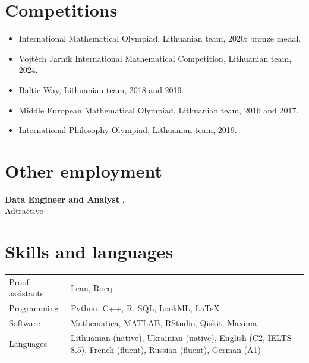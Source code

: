 \documentclass[10.5pt,a4paper]{article}
\newlength{\datecol}\setlength{\datecol}{2.4cm}
\newcommand{\entry}[4]{%
  \noindent\makebox[\datecol][l]{\textcolor{muted}{#1}}%
  \parbox[t]{\dimexpr\textwidth-\datecol\relax}{\textbf{#2}%
    \if\relax\detokenize{#3}\relax\else, #3\fi
    \if\relax\detokenize{#4}\relax\else\\[0.1em]{\small #4}\fi}\par\vspace{0.45em}}
\begin{document}
\section{Competitions}
\begin{itemize}
  \item International Mathematical Olympiad, Lithuanian team, 2020: bronze medal.
  \item Vojtěch Jarník International Mathematical Competition, Lithuanian team, 2024.
  \item Baltic Way, Lithuanian team, 2018 and 2019.
  \item Middle European Mathematical Olympiad, Lithuanian team, 2016 and 2017.
  \item International Philosophy Olympiad, Lithuanian team, 2019.
\end{itemize}

\section{Other employment}
\entry{2023 -- 2024}{Data Engineer and Analyst}{}{Adtractive}

\section{Skills and languages}
\begin{tabular}{@{}p{3.0cm}p{\dimexpr\textwidth-3.0cm-2\tabcolsep\relax}@{}}
\textcolor{muted}{Proof assistants} & Lean, Rocq\\[0.15em]
\textcolor{muted}{Programming} & Python, C++, R, SQL, LookML, \LaTeX\\[0.15em]
\textcolor{muted}{Software} & Mathematica, MATLAB, RStudio, Qiskit, Maxima\\[0.15em]
\textcolor{muted}{Languages} & Lithuanian (native), Ukrainian (native), English (C2, IELTS 8.5), French (fluent), Russian (fluent), German (A1)\\
\end{tabular}
\end{document}
